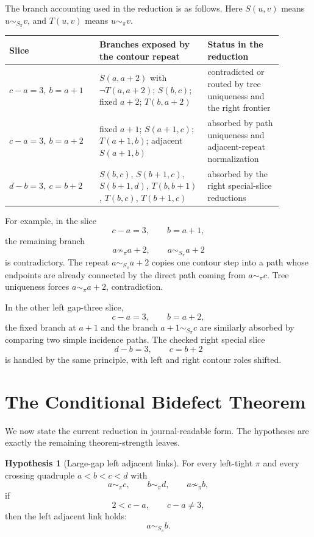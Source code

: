 \documentclass[11pt]{article}
\theoremstyle{plain}
\theoremstyle{definition}
\newtheorem{hypothesis}[theorem]{Hypothesis}
\theoremstyle{remark}
\newcommand{\p}{\pi}
\begin{document}
The branch accounting used in the reduction is as follows.  Here \(S(u,v)\)
means \(u\sim_{S_\p}v\), and \(T(u,v)\) means \(u\sim_\p v\).

\begin{center}
\begin{tabular}{L{0.28\linewidth}L{0.36\linewidth}L{0.25\linewidth}}
\hline
Slice & Branches exposed by the contour repeat & Status in the reduction\\
\hline
\(c-a=3,\ b=a+1\)
&
\(S(a,a+2)\) with \(\neg T(a,a+2)\);
\(S(b,c)\);
fixed \(a+2\);
\(T(b,a+2)\)
&
contradicted or routed by tree uniqueness and the right frontier\\
\(c-a=3,\ b=a+2\)
&
fixed \(a+1\);
\(S(a+1,c)\);
\(T(a+1,b)\);
adjacent \(S(a+1,b)\)
&
absorbed by path uniqueness and adjacent-repeat normalization\\
\(d-b=3,\ c=b+2\)
&
\(S(b,c)\), \(S(b+1,c)\), \(S(b+1,d)\),
\(T(b,b+1)\), \(T(b,c)\), \(T(b+1,c)\)
&
absorbed by the right special-slice reductions\\
\hline
\end{tabular}
\end{center}

For example, in the slice
\[
  c-a=3,\qquad b=a+1,
\]
the remaining branch
\[
  a\not\sim_\p a+2,\qquad a\sim_{S_\p} a+2
\]
is contradictory.  The repeat \(a\sim_{S_\p} a+2\) copies one contour step
into a path whose endpoints are already connected by the direct path coming
from \(a\sim_\p c\).  Tree uniqueness forces \(a\sim_\p a+2\), contradiction.

In the other left gap-three slice,
\[
  c-a=3,\qquad b=a+2,
\]
the fixed branch at \(a+1\) and the branch \(a+1\sim_{S_\p}c\) are similarly
absorbed by comparing two simple incidence paths.  The checked right special
slice
\[
  d-b=3,\qquad c=b+2
\]
is handled by the same principle, with left and right contour roles shifted.

\section{The Conditional Bidefect Theorem}

We now state the current reduction in journal-readable form.  The hypotheses
are exactly the remaining theorem-strength leaves.

\begin{hypothesis}[Large-gap left adjacent links]
For every left-tight \(\p\) and every crossing quadruple \(a<b<c<d\) with
\[
  a\sim_\p c,\qquad b\sim_\p d,\qquad a\not\sim_\p b,
\]
if
\[
  2<c-a,\qquad c-a\neq 3,
\]
then the left adjacent link holds:
\[
  a\sim_{S_\p} b.
\]
\end{hypothesis}
\end{document}

